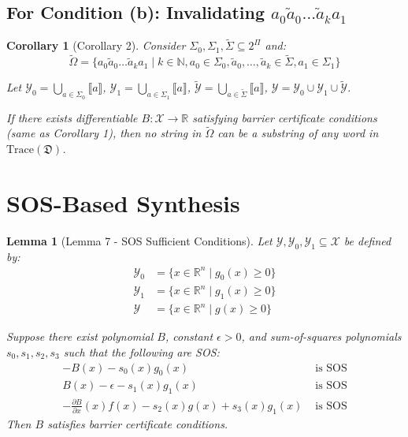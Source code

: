 \documentclass{article}
\newtheorem{lemma}{Lemma}
\newtheorem{corollary}{Corollary}
\begin{document}
\subsection{For Condition (b): Invalidating $a_0 \tilde{a}_0 \ldots \tilde{a}_k a_1$}

\begin{corollary}[Corollary 2]
Consider $\Sigma_0, \Sigma_1, \tilde{\Sigma} \subseteq 2^\Pi$ and:
\begin{equation}
\tilde{\Omega} = \{a_0 \tilde{a}_0 \ldots \tilde{a}_k a_1 \mid k \in \mathbb{N}, a_0 \in \Sigma_0, \tilde{a}_0,\ldots,\tilde{a}_k \in \tilde{\Sigma}, a_1 \in \Sigma_1\}
\end{equation}

Let $\mathcal{Y}_0 = \bigcup_{a \in \Sigma_0} \llbracket a \rrbracket$, $\mathcal{Y}_1 = \bigcup_{a \in \Sigma_1} \llbracket a \rrbracket$, $\tilde{\mathcal{Y}} = \bigcup_{a \in \tilde{\Sigma}} \llbracket a \rrbracket$, $\mathcal{Y} = \mathcal{Y}_0 \cup \mathcal{Y}_1 \cup \tilde{\mathcal{Y}}$.

If there exists differentiable $B: \mathcal{X} \to \mathbb{R}$ satisfying barrier certificate conditions (same as Corollary 1), then no string in $\tilde{\Omega}$ can be a substring of any word in $\text{Trace}(\mathfrak{D})$.
\end{corollary}

\section{SOS-Based Synthesis}

\begin{lemma}[Lemma 7 - SOS Sufficient Conditions]
Let $\mathcal{Y}, \mathcal{Y}_0, \mathcal{Y}_1 \subseteq \mathcal{X}$ be defined by:
\begin{align}
\mathcal{Y}_0 &= \{x \in \mathbb{R}^n \mid g_0(x) \geq 0\}\\
\mathcal{Y}_1 &= \{x \in \mathbb{R}^n \mid g_1(x) \geq 0\}\\
\mathcal{Y} &= \{x \in \mathbb{R}^n \mid g(x) \geq 0\}
\end{align}

Suppose there exist polynomial $B$, constant $\epsilon > 0$, and sum-of-squares polynomials $s_0, s_1, s_2, s_3$ such that the following are SOS:
\begin{align}
-B(x) - s_0(x) g_0(x) &\text{ is SOS} \label{eq:sos1}\\
B(x) - \epsilon - s_1(x) g_1(x) &\text{ is SOS} \label{eq:sos2}\\
-\frac{\partial B}{\partial x}(x) f(x) - s_2(x) g(x) + s_3(x) g_1(x) &\text{ is SOS} \label{eq:sos3}
\end{align}
Then $B$ satisfies barrier certificate conditions.
\end{lemma}
\end{document}
